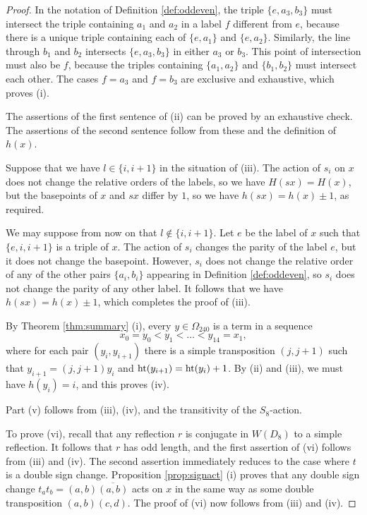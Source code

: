 \documentclass{amsart}
\theoremstyle{plain}
\theoremstyle{definition}
\theoremstyle{remark}
\numberwithin{equation}{section}
\newcommand{\rootht}{\text{\rm ht}}
\newcommand{\qpx}{\Omega_{240}}
\begin{document}
\begin{proof}
In the notation of Definition \ref{def:oddeven}, the triple $\{e, a_3, b_3\}$ must intersect the triple containing
$a_1$ and $a_2$ in a label $f$ different from $e$, because there is a unique triple containing each of $\{e, a_1\}$ and 
$\{e, a_2\}$. Similarly, the line through $b_1$ and $b_2$ intersects $\{e, a_3, b_3\}$ in either $a_3$ or $b_3$.
This point of intersection must also be $f$, because the triples containing $\{a_1, a_2\}$ and $\{b_1, b_2\}$ must
intersect each other. The cases $f = a_3$ and $f = b_3$ are exclusive and exhaustive, which proves (i).

The assertions of the first sentence of (ii) can be proved by an exhaustive check. The assertions of the second
sentence follow from these and the definition of $h(x)$.
 
Suppose that we have $l \in \{i, i+1\}$ in the situation of (iii). The action of $s_i$ on $x$ does not change the
relative orders of the labels, so we have $H(sx) = H(x)$, but the basepoints of $x$ and $sx$ differ by $1$,
so we have $h(sx) = h(x) \pm 1$, as required. 

We may suppose from now on that $l \not\in \{i, i+1\}$. Let $e$ be the label of $x$ such that $\{e, i, i+1\}$ is 
a triple of $x$. The action of $s_i$ changes the parity of the label $e$, but it does not change
the basepoint. However, $s_i$ does not change the relative order of any of the other pairs $\{a_i, b_i\}$ appearing in 
Definition \ref{def:oddeven}, so $s_i$ does not change the parity of any other label. It follows that we
have $h(sx) = h(x) \pm 1$, which completes the proof of (iii).

By Theorem \ref{thm:summary} (i), every $y \in \qpx$ is a term in a sequence $$
x_0 = y_0 < y_1 < \ldots < y_{14} = x_1
,$$ where for each pair $(y_i, y_{i+1})$ there is a simple transposition $(j, j+1)$ such that $y_{i+1} = (j, j+1)y_i$
and $\rootht(y_{i+1}) = \rootht(y_i) + 1$. By (ii) and (iii), we must have $h(y_i) = i$, and this proves (iv).

Part (v) follows from (iii), (iv), and the transitivity of the $S_8$-action.

To prove (vi), recall that any reflection $r$ is conjugate in $W(D_8)$ to a simple reflection. It follows that $r$
has odd length, and the first assertion of (vi) follows from (iii) and (iv). The second assertion immediately reduces
to the case where $t$ is a double sign change. Proposition \ref{prop:signact} (i) proves that any double sign change 
$t_a t_b = (a, b) \overline{(a, b)}$ acts on $x$ in the same way as some double transposition $(a, b)(c, d)$. The
proof of (vi) now follows from (iii) and (iv).


\end{proof}
\end{document}
